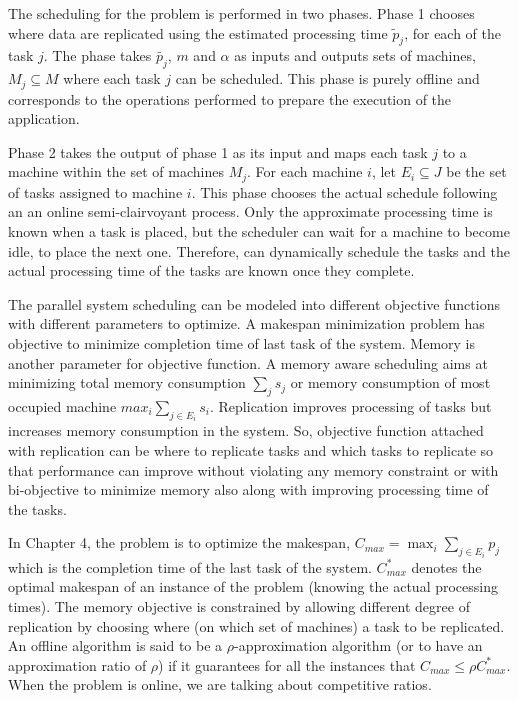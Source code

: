\documentclass[12pt]{article}
\theoremstyle{mystyle}
\begin{document}
 
 The scheduling for the problem is performed in two phases. Phase 1
 chooses where data are replicated using the estimated processing time
 $\tilde p_j $, for each of the task $j$. The phase takes
 $\tilde{p_j}$, $m$ and $\alpha$ as inputs and outputs sets of machines,
 $M_j \subseteq M $ where each task $j$ can be scheduled. This phase is
 purely offline and corresponds to the operations performed to prepare
 the execution of the application.
 
 Phase 2 takes the output of phase 1 as its input and maps each task $j$
 to a machine within the set of machines $M_j$. For each machine $i$,
 let $E_i \subseteq J$ be the set of tasks assigned to machine
 $i$. This phase chooses the actual schedule following an an online
 semi-clairvoyant process. Only the approximate processing time is
 known when a task is placed, but the scheduler can wait for a machine
 to become idle, to place the next one. Therefore, can dynamically
 schedule the tasks and the actual processing time of the tasks are
 known once they complete.
 
 
 
 The  parallel system scheduling can be modeled into different objective functions with different parameters to optimize. A makespan minimization problem has objective to minimize completion time of last task of the system. Memory is another parameter for objective function. A memory aware scheduling aims at minimizing total memory consumption $\sum_{j}^{}s_j$ or memory consumption of most occupied machine $max_i\sum_{j\in E_i}^{}s_i$. Replication improves processing of tasks but increases memory consumption in the system. So, objective function attached with replication can be where to replicate tasks and which tasks to replicate so that performance can improve without violating any memory constraint or with bi-objective to minimize memory also along with improving processing time of the tasks.
 
 
 In Chapter 4, the problem is to optimize the makespan, $C_{max} = \max_i \sum_{j \in
    E_i} p_j$ which is the completion time of the last task of the
  system. $C_{max}^{*}$ denotes the optimal makespan of an instance of
  the problem (knowing the actual processing times). The memory objective is constrained by allowing different degree of replication by choosing where (on which set of machines) a task to be replicated. An offline algorithm is
  said to be a $\rho$-approximation algorithm (or to have an
  approximation ratio of $\rho$) if it guarantees for all the instances
  that $C_{max} \leq \rho C_{max}^*$. When the problem is online, we are
  talking about competitive ratios.
  
\end{document}
